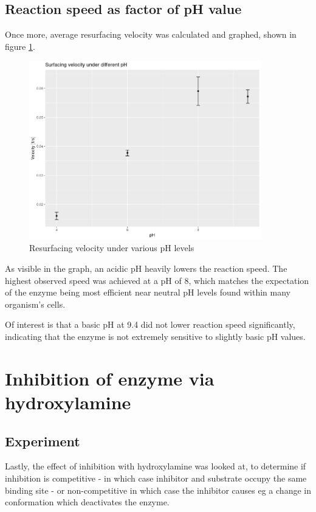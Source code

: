 \documentclass[a4paper,english]{scrreprt}
\begin{document}
\subsection{Reaction speed as factor of pH value}

Once more, average resurfacing velocity was calculated and graphed, shown in figure
\ref{fig:ph}.

\begin{figure}
	\centering
	\includegraphics[width=0.9\textwidth]{img/ph.png}
	\caption{Resurfacing velocity under various pH levels}
	\label{fig:ph}
\end{figure}

As visible in the graph, an acidic pH heavily lowers the reaction speed. The
highest observed speed was achieved at a pH of 8, which matches the expectation
of the enzyme being most efficient near neutral pH levels found within many
organism's cells.

Of interest is that a basic pH at 9.4 did not lower reaction speed
significantly, indicating that the enzyme is not extremely sensitive to
slightly basic pH values.

\section{Inhibition of enzyme via hydroxylamine}

\subsection{Experiment}

Lastly, the effect of inhibition with hydroxylamine was looked at, to determine
if inhibition is competitive - in which case inhibitor and substrate occupy the
same binding site - or non-competitive in which case the inhibitor causes eg a
change in conformation which deactivates the enzyme.
\end{document}
